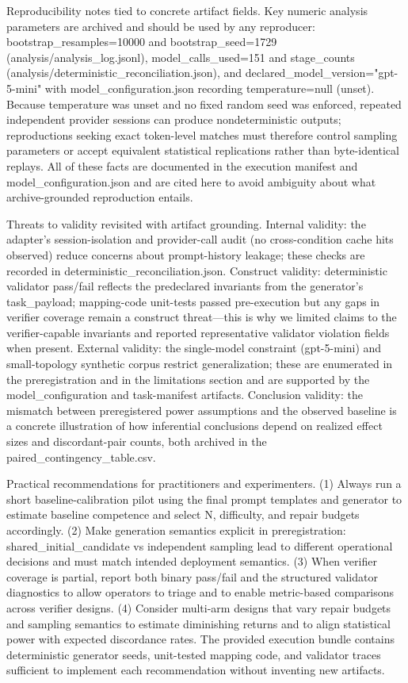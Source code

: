 \documentclass[conference]{IEEEtran}
\begin{document}
Reproducibility notes tied to concrete artifact fields. Key numeric analysis parameters are archived and should be used by any reproducer: bootstrap\_resamples=10000 and bootstrap\_seed=1729 (analysis/analysis\_log.jsonl), model\_calls\_used=151 and stage\_counts (analysis/deterministic\_reconciliation.json), and declared\_model\_version="gpt-5-mini" with model\_configuration.json recording temperature=null (unset). Because temperature was unset and no fixed random seed was enforced, repeated independent provider sessions can produce nondeterministic outputs; reproductions seeking exact token-level matches must therefore control sampling parameters or accept equivalent statistical replications rather than byte-identical replays. All of these facts are documented in the execution manifest and model\_configuration.json and are cited here to avoid ambiguity about what archive-grounded reproduction entails.

Threats to validity revisited with artifact grounding. Internal validity: the adapter's session-isolation and provider-call audit (no cross-condition cache hits observed) reduce concerns about prompt-history leakage; these checks are recorded in deterministic\_reconciliation.json. Construct validity: deterministic validator pass/fail reflects the predeclared invariants from the generator's task\_payload; mapping-code unit-tests passed pre-execution but any gaps in verifier coverage remain a construct threat---this is why we limited claims to the verifier-capable invariants and reported representative validator violation fields when present. External validity: the single-model constraint (gpt-5-mini) and small-topology synthetic corpus restrict generalization; these are enumerated in the preregistration and in the limitations section and are supported by the model\_configuration and task-manifest artifacts. Conclusion validity: the mismatch between preregistered power assumptions and the observed baseline is a concrete illustration of how inferential conclusions depend on realized effect sizes and discordant-pair counts, both archived in the paired\_contingency\_table.csv.

Practical recommendations for practitioners and experimenters. (1) Always run a short baseline-calibration pilot using the final prompt templates and generator to estimate baseline competence and select N, difficulty, and repair budgets accordingly. (2) Make generation semantics explicit in preregistration: shared\_initial\_candidate vs independent sampling lead to different operational decisions and must match intended deployment semantics. (3) When verifier coverage is partial, report both binary pass/fail and the structured validator diagnostics to allow operators to triage and to enable metric-based comparisons across verifier designs. (4) Consider multi-arm designs that vary repair budgets and sampling semantics to estimate diminishing returns and to align statistical power with expected discordance rates. The provided execution bundle contains deterministic generator seeds, unit-tested mapping code, and validator traces sufficient to implement each recommendation without inventing new artifacts.
\end{document}
